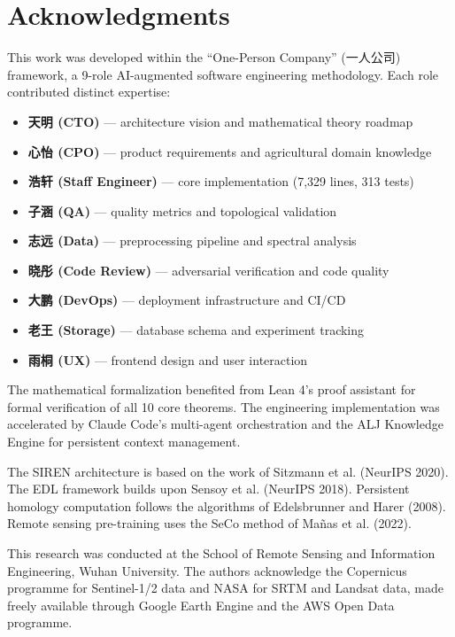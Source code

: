 \section*{Acknowledgments}

This work was developed within the ``One-Person Company'' (一人公司)
framework, a 9-role AI-augmented software engineering methodology.
Each role contributed distinct expertise:

\begin{itemize}[nosep]
    \item \textbf{天明 (CTO)} — architecture vision and mathematical theory roadmap
    \item \textbf{心怡 (CPO)} — product requirements and agricultural domain knowledge
    \item \textbf{浩轩 (Staff Engineer)} — core implementation (7,329 lines, 313 tests)
    \item \textbf{子涵 (QA)} — quality metrics and topological validation
    \item \textbf{志远 (Data)} — preprocessing pipeline and spectral analysis
    \item \textbf{晓彤 (Code Review)} — adversarial verification and code quality
    \item \textbf{大鹏 (DevOps)} — deployment infrastructure and CI/CD
    \item \textbf{老王 (Storage)} — database schema and experiment tracking
    \item \textbf{雨桐 (UX)} — frontend design and user interaction
\end{itemize}

The mathematical formalization benefited from Lean 4's proof assistant for
formal verification of all 10 core theorems. The engineering implementation
was accelerated by Claude Code's multi-agent orchestration and the ALJ
Knowledge Engine for persistent context management.

The SIREN architecture is based on the work of Sitzmann et al. (NeurIPS 2020).
The EDL framework builds upon Sensoy et al. (NeurIPS 2018). Persistent
homology computation follows the algorithms of Edelsbrunner and Harer (2008).
Remote sensing pre-training uses the SeCo method of Ma\~{n}as et al. (2022).

This research was conducted at the School of Remote Sensing and Information
Engineering, Wuhan University. The authors acknowledge the Copernicus
programme for Sentinel-1/2 data and NASA for SRTM and Landsat data,
made freely available through Google Earth Engine and the AWS Open Data
programme.
